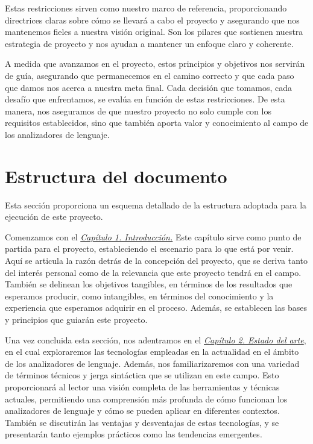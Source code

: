 Estas restricciones sirven como nuestro marco de referencia, proporcionando directrices claras sobre cómo se llevará a cabo el proyecto y asegurando que nos mantenemos fieles a nuestra visión original. Son los pilares que sostienen nuestra estrategia de proyecto y nos ayudan a mantener un enfoque claro y coherente.

A medida que avanzamos en el proyecto, estos principios y objetivos nos servirán de guía, asegurando que permanecemos en el camino correcto y que cada paso que damos nos acerca a nuestra meta final. Cada decisión que tomamos, cada desafío que enfrentamos, se evalúa en función de estas restricciones. De esta manera, nos aseguramos de que nuestro proyecto no solo cumple con los requisitos establecidos, sino que también aporta valor y conocimiento al campo de los analizadores de lenguaje.

\section{Estructura del documento}

\noindent Esta sección proporciona un esquema detallado de la estructura adoptada para la ejecución de este proyecto.

Comenzamos con el \hyperref[sec:cap1]{\textit{Capítulo 1. Introducción.}} Este capítulo sirve como punto de partida para el proyecto, estableciendo el escenario para lo que está por venir. Aquí se articula la razón detrás de la concepción del proyecto, que se deriva tanto del interés personal como de la relevancia que este proyecto tendrá en el campo. También se delinean los objetivos tangibles, en términos de los resultados que esperamos producir, como intangibles, en términos del conocimiento y la experiencia que esperamos adquirir en el proceso. Además, se establecen las bases y principios que guiarán este proyecto.

Una vez concluida esta sección, nos adentramos en el \hyperref[sec:cap2]{\textit{Capítulo 2. Estado del arte}}, en el cual exploraremos las tecnologías empleadas en la actualidad en el ámbito de los analizadores de lenguaje. Además, nos familiarizaremos con una variedad de términos técnicos y jerga sintáctica que se utilizan en este campo. Esto proporcionará al lector una visión completa de las herramientas y técnicas actuales, permitiendo una comprensión más profunda de cómo funcionan los analizadores de lenguaje y cómo se pueden aplicar en diferentes contextos. También se discutirán las ventajas y desventajas de estas tecnologías, y se presentarán tanto ejemplos prácticos como las tendencias emergentes.

